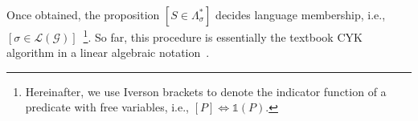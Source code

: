 \documentclass[runningheads]{llncs}
\begin{document}
\hspace{-0.5cm}

  Once obtained, the proposition $[S \in \Lambda^*_\sigma]$ decides language membership, i.e., $[\sigma \in \mathcal{L}(\mathcal{G})]$~\footnote{Hereinafter, we use Iverson brackets to denote the indicator function of a predicate with free variables, i.e., $[P] \Leftrightarrow \mathds{1}(P)$.}. So far, this procedure is essentially the textbook CYK algorithm in a linear algebraic notation~\cite{goodman1999semiring}.
\end{document}

